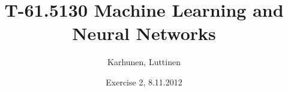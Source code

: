 
\title{T-61.5130 Machine Learning and Neural Networks}
\author{Karhunen, Luttinen}
\date{Exercise 2, 8.11.2012}

\usepackage{cancel}
\usepackage{listings}

\newcommand{\vect}[1]{{\bf{#1}}}
\newcommand{\svect}[1]{\boldsymbol{#1}}
\newcommand{\matr}[1]{\boldsymbol{#1}}
\newcommand{\vw}{{\bf{w}}}
\newcommand{\ve}{{\bf{e}}}
\newcommand{\vx}{{\bf{x}}}



\maketitle

